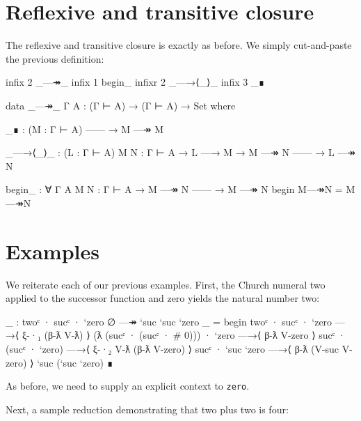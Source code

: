 \hypertarget{reflexive-and-transitive-closure}{%
\section{Reflexive and transitive
closure}\label{reflexive-and-transitive-closure}}

The reflexive and transitive closure is exactly as before. We simply
cut-and-paste the previous definition:

\begin{fence}
\begin{code}
infix  2 _—↠_
infix  1 begin_
infixr 2 _—→⟨_⟩_
infix  3 _∎

data _—↠_ {Γ A} : (Γ ⊢ A) → (Γ ⊢ A) → Set where

  _∎ : (M : Γ ⊢ A)
      ------
    → M —↠ M

  _—→⟨_⟩_ : (L : Γ ⊢ A) {M N : Γ ⊢ A}
    → L —→ M
    → M —↠ N
      ------
    → L —↠ N

begin_ : ∀ {Γ A} {M N : Γ ⊢ A}
  → M —↠ N
    ------
  → M —↠ N
begin M—↠N = M—↠N
\end{code}
\end{fence}

\hypertarget{examples}{%
\section{Examples}\label{examples}}

We reiterate each of our previous examples. First, the Church numeral
two applied to the successor function and zero yields the natural number
two:

\begin{fence}
\begin{code}
_ : twoᶜ · sucᶜ · `zero {∅} —↠ `suc `suc `zero
_ =
  begin
    twoᶜ · sucᶜ · `zero
  —→⟨ ξ-·₁ (β-ƛ V-ƛ) ⟩
    (ƛ (sucᶜ · (sucᶜ · # 0))) · `zero
  —→⟨ β-ƛ V-zero ⟩
    sucᶜ · (sucᶜ · `zero)
  —→⟨ ξ-·₂ V-ƛ (β-ƛ V-zero) ⟩
    sucᶜ · `suc `zero
  —→⟨ β-ƛ (V-suc V-zero) ⟩
   `suc (`suc `zero)
  ∎
\end{code}
\end{fence}

As before, we need to supply an explicit context to
\texttt{\textasciigrave{}zero}.

Next, a sample reduction demonstrating that two plus two is four:

